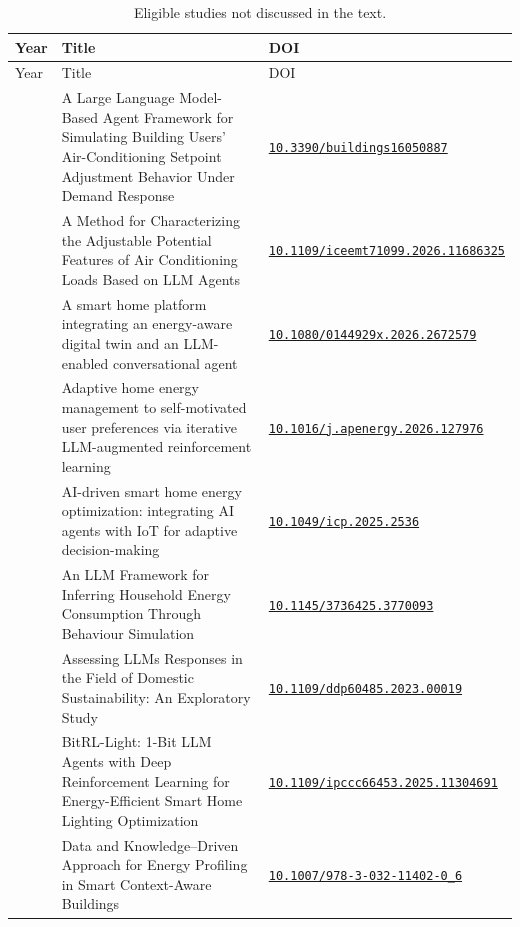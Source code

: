 \documentclass[12pt,a4paper]{report}
\begin{document}
{\begin{longtable}{>{\raggedright\arraybackslash}p{}>{\raggedright\arraybackslash}p{}>{\raggedright\arraybackslash}p{}}
\caption{Eligible studies not discussed in the text.}
\label{tab:studies-other}\\
\toprule
Year & Title & DOI \\
\midrule
\endfirsthead
\toprule
Year & Title & DOI \\
\midrule
\endhead
\bottomrule
\endfoot
2026 & A Large Language Model-Based Agent Framework for Simulating Building Users’ Air-Conditioning Setpoint Adjustment Behavior Under Demand Response & \href{https://doi.org/10.3390/buildings16050887}{\nolinkurl{10.3390/buildings16050887}} \\[3pt]
2026 & A Method for Characterizing the Adjustable Potential Features of Air Conditioning Loads Based on LLM Agents & \href{https://doi.org/10.1109/iceemt71099.2026.11686325}{\nolinkurl{10.1109/iceemt71099.2026.11686325}} \\[3pt]
2026 & A smart home platform integrating an energy-aware digital twin and an LLM-enabled conversational agent & \href{https://doi.org/10.1080/0144929x.2026.2672579}{\nolinkurl{10.1080/0144929x.2026.2672579}} \\[3pt]
2026 & Adaptive home energy management to self-motivated user preferences via iterative LLM-augmented reinforcement learning & \href{https://doi.org/10.1016/j.apenergy.2026.127976}{\nolinkurl{10.1016/j.apenergy.2026.127976}} \\[3pt]
2025 & AI-driven smart home energy optimization: integrating AI agents with IoT for adaptive decision-making & \href{https://doi.org/10.1049/icp.2025.2536}{\nolinkurl{10.1049/icp.2025.2536}} \\[3pt]
2025 & An LLM Framework for Inferring Household Energy Consumption Through Behaviour Simulation & \href{https://doi.org/10.1145/3736425.3770093}{\nolinkurl{10.1145/3736425.3770093}} \\[3pt]
2023 & Assessing LLMs Responses in the Field of Domestic Sustainability: An Exploratory Study & \href{https://doi.org/10.1109/ddp60485.2023.00019}{\nolinkurl{10.1109/ddp60485.2023.00019}} \\[3pt]
2025 & BitRL-Light: 1-Bit LLM Agents with Deep Reinforcement Learning for Energy-Efficient Smart Home Lighting Optimization & \href{https://doi.org/10.1109/ipccc66453.2025.11304691}{\nolinkurl{10.1109/ipccc66453.2025.11304691}} \\[3pt]
2025 & Data and Knowledge–Driven Approach for Energy Profiling in Smart Context-Aware Buildings & \href{https://doi.org/10.1007/978-3-032-11402-0_6}{\nolinkurl{10.1007/978-3-032-11402-0_6}} \\[3pt]

\end{longtable}}
\end{document}
